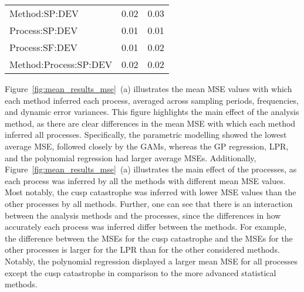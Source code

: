 \documentclass[man, floatsintext]{apa7}
\begin{document}
\begin{table}[tbp]
\begin{center}
\begin{threeparttable}
\begin{tabular}{lll}
        \\
        Method:SP:DEV         & 0.02                                     & 0.03
        \\
        Process:SP:DEV        & 0.01                                     & 0.01
        \\
        Process:SF:DEV        & 0.01                                     & 0.02
        \\
        Method:Process:SP:DEV & 0.02                                     & 0.02
        \\
        \bottomrule
      \end{tabular}
    \end{threeparttable}
  \end{center}

\end{table}

Figure~\ref{fig:mean_results_mse}~(a) illustrates the mean MSE values with
which each method inferred each process, averaged across sampling periods,
frequencies, and dynamic error variances. This figure highlights the main
effect of the analysis method, as there are clear differences in the mean MSE
with which each method inferred all processes. Specifically, the parametric
modelling showed the lowest average MSE, followed closely by the GAMs, whereas
the GP regression, LPR, and the polynomial regression had larger average MSEs.
Additionally, Figure~\ref{fig:mean_results_mse}~(a) illustrates the main effect
of the processes, as each process was inferred by all the methods with
different mean MSE values. Most notably, the cusp catastrophe was inferred with
lower MSE values than the other processes by all methods. Further, one can see
that there is an interaction between the analysis methods and the processes,
since the differences in how accurately each process was inferred differ
between the methods. For example, the difference between the MSEs for the cusp
catastrophe and the MSEs for the other processes is larger for the LPR than for
the other considered methods. Notably, the polynomial regression displayed a
larger mean MSE for all processes except the cusp catastrophe in comparison to
the more advanced statistical methods.

\begin{sidewaysfigure*}[htbp]
  \caption{Mean MSE effects across all processes, analysis
    methods, and simulation conditions}
  \label{fig:mean_results_mse}
\end{sidewaysfigure*}
\end{document}
